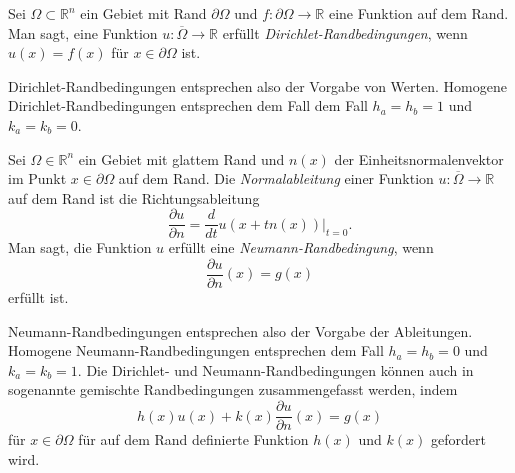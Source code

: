 \begin{definition}
Sei $\Omega\subset\mathbb{R}^n$ ein Gebiet mit Rand $\partial\Omega$
und $f\colon \partial\Omega\to\mathbb{R}$ eine Funktion auf dem Rand.
Man sagt, eine Funktion $u\colon\overline{\Omega}\to\mathbb{R}$ erfüllt 
{\em Dirichlet-Randbedingungen}, wenn
%
%
\(
u(x) = f(x)
\)
für $x\in \partial\Omega$ ist.
\end{definition}

Dirichlet-Randbedingungen entsprechen also der Vorgabe von Werten.
Homogene Dirichlet-Randbedingungen entsprechen dem Fall
dem Fall $h_a=h_b=1$ und $k_a=k_b=0$.

\begin{definition}
Sei $\Omega\in\mathbb{R}^n$ ein Gebiet mit glattem Rand und
$n(x)$ der Einheitsnormalenvektor im Punkt $x\in\partial\Omega$
auf dem Rand.
Die {\em Normalableitung} einer Funktion
%
$u\colon\overline{\Omega}\to \mathbb{R}$ auf dem Rand ist die
Richtungsableitung
\[
\frac{\partial u}{\partial n}
=
\frac{d}{dt} u(x+tn(x))\bigg|_{t=0}.
\]
Man sagt, die Funktion $u$ erfüllt eine {\em Neumann-Randbedingung}, wenn
%
%
\[
\frac{\partial u}{\partial n}(x) = g(x)
\]
erfüllt ist.
\end{definition}

Neumann-Randbedingungen entsprechen also der Vorgabe der Ableitungen.
Homogene Neumann-Randbedingungen entsprechen dem Fall
$h_a=h_b=0$ und $k_a=k_b=1$.
Die Dirichlet- und Neumann-Randbedingungen können auch in sogenannte
gemischte Randbedingungen zusammengefasst werden, indem 
%
%
\begin{equation}
h(x) u(x) + k(x) \frac{\partial u}{\partial n}(x) = g(x)
\label{buch:orthofunkt:pde:eqn:gemischterandbedingung}
\end{equation}
für  $x \in\partial \Omega$ für auf dem Rand definierte Funktion
$h(x)$ und $k(x)$ gefordert wird.

%
%
